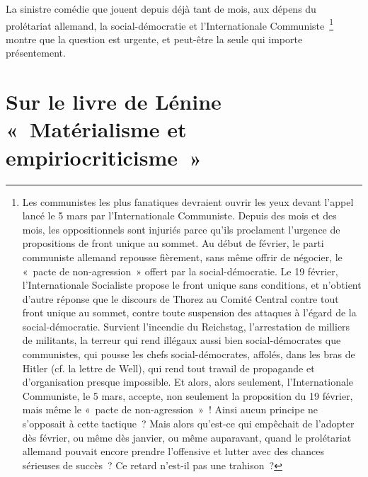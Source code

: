 \documentclass[french,twoside]{book} %
\begin{document}
La sinistre comédie que jouent depuis déjà tant de mois, aux dépens du prolétariat allemand, la social-démocratie et l'Internationale Communiste \footnote{Les communistes les plus fanatiques devraient ouvrir les yeux devant l'appel lancé le 5 mars par l'Internationale Communiste. Depuis des mois et des mois, les oppositionnels sont injuriés parce qu'ils proclament l'urgence de propositions de front unique au sommet. Au début de février, le parti communiste allemand repousse fièrement, sans même offrir de négocier, le « pacte de non-agression » offert par la social-démocratie. Le 19 février, l'Internationale Socialiste propose le front unique sans conditions, et n'obtient d'autre réponse que le discours de Thorez au Comité Central contre tout front unique au sommet, contre toute suspension des attaques à l'égard de la social-démocratie. Survient l'incendie du Reichstag, l'arrestation de milliers de militants, la terreur qui rend illégaux aussi bien social-démocrates que communistes, qui pousse les chefs social-démocrates, affolés, dans les bras de Hitler (cf. la lettre de Well), qui rend tout travail de propagande et d'organisation presque impossible. Et alors, alors seulement, l'Internationale Communiste, le 5 mars, accepte, non seulement la proposition du 19 février, mais même le « pacte de non-agression » ! Ainsi aucun principe ne s'opposait à cette tactique ? Mais alors qu'est-ce qui empêchait de l'adopter dès février, ou même dès janvier, ou même auparavant, quand le prolétariat allemand pouvait encore prendre l'offensive et lutter avec des chances sérieuses de succès ? Ce retard n'est-il pas une trahison ?} montre que la question est urgente, et peut-être la seule qui importe présentement.\par

\begin{center}
\end{center}
\section[Sur le livre de Lénine « Matérialisme et empiriocriticisme »]{Sur le livre de Lénine « Matérialisme et empiriocriticisme »}\renewcommand{\leftmark}{Sur le livre de Lénine « Matérialisme et empiriocriticisme »}
\end{document}
